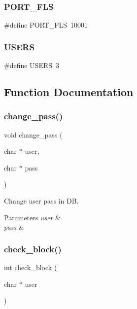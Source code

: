 \subsubsection{P\+O\+R\+T\+\_\+\+F\+LS}
{\footnotesize\ttfamily \#define P\+O\+R\+T\+\_\+\+F\+LS~10001}

\mbox{\label{auth_8h_a322789c10f93ef5e09a1d5f17aabf0e3}} 
\subsubsection{U\+S\+E\+RS}
{\footnotesize\ttfamily \#define U\+S\+E\+RS~3}



\subsection{Function Documentation}
\mbox{\label{auth_8h_a97aeb8e1fb29fa958c8ea862bda5ba69}} 
\subsubsection{change\+\_\+pass()}
{\footnotesize\ttfamily void change\+\_\+pass (\begin{DoxyParamCaption}\item[{char $\ast$}]{user,  }\item[{char $\ast$}]{pass }\end{DoxyParamCaption})}



Change user pass in DB. 


\begin{DoxyParams}{Parameters}
{\em user} & \\
\hline
{\em pass} & \\
\hline
\end{DoxyParams}
\mbox{\label{auth_8h_a3bf3271f2878741a36a522714fc1180b}} 
\subsubsection{check\+\_\+block()}
{\footnotesize\ttfamily int check\+\_\+block (\begin{DoxyParamCaption}\item[{char $\ast$}]{user }\end{DoxyParamCaption})}



